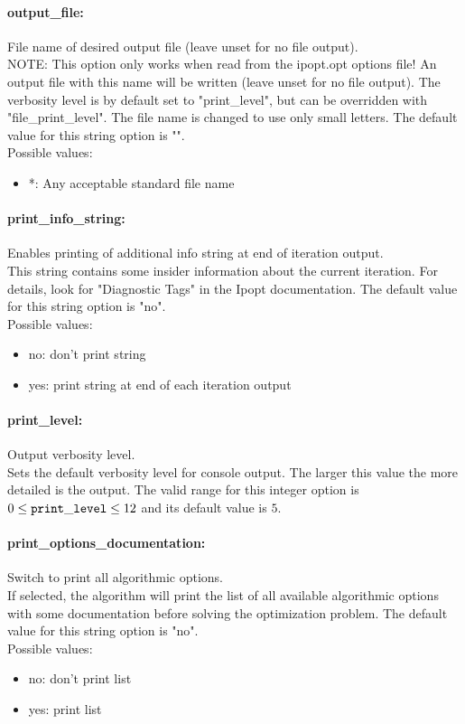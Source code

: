 \paragraph{output\_file:}\label{sec:output_file} File name of desired output file (leave unset for no file output). $\;$ \\
 NOTE: This option only works when read from the
ipopt.opt options file! An output file with this
name will be written (leave unset for no file
output).  The verbosity level is by default set
to "print\_level", but can be overridden with
"file\_print\_level".  The file name is changed
to use only small letters.
The default value for this string option is "".
\\ 
Possible values:
\begin{itemize}
   \item *: Any acceptable standard file name
\end{itemize}

\paragraph{print\_info\_string:}\label{sec:print_info_string} Enables printing of additional info string at end of iteration output. $\;$ \\
 This string contains some insider information
about the current iteration.  For details, look
for "Diagnostic Tags" in the Ipopt documentation.
The default value for this string option is "no".
\\ 
Possible values:
\begin{itemize}
   \item no: don't print string
   \item yes: print string at end of each iteration output
\end{itemize}

\paragraph{print\_level:}\label{sec:print_level} Output verbosity level. $\;$ \\
 Sets the default verbosity level for console
output. The larger this value the more detailed
is the output. The valid range for this integer option is
$0 \le {\tt print\_level } \le 12$
and its default value is $5$.


\paragraph{print\_options\_documentation:}\label{sec:print_options_documentation} Switch to print all algorithmic options. $\;$ \\
 If selected, the algorithm will print the list of
all available algorithmic options with some
documentation before solving the optimization
problem.
The default value for this string option is "no".
\\ 
Possible values:
\begin{itemize}
   \item no: don't print list
   \item yes: print list
\end{itemize}

